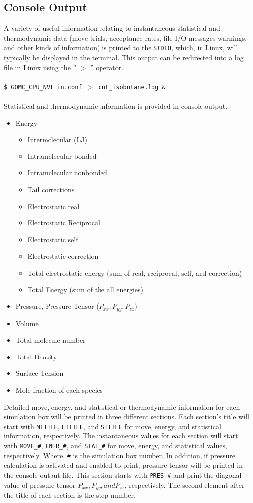 \subsection{Console Output}
A variety of useful information relating to instantaneous statistical and thermodynamic data (move trials, acceptance rates, file I/O messages warnings, and other kinds of information) is printed to the \texttt{STDIO}, which, in Linux, will typically be displayed in the terminal.  This output can be redirected into a log file in Linux using the '' $>$ '' operator.\\\\
\texttt{\$ GOMC\_CPU\_NVT   in.conf   $>$   out\_isobutane.log \&}\\\\
Statistical and thermodynamic information is provided in console output.\\
\begin{itemize}
\item Energy
	\begin{itemize}
	\item Intermolecular (LJ)
	\item Intramolecular bonded
	\item Intramolecular nonbonded
	\item Tail corrections
	\item Electrostatic real
	\item Electrostatic Reciprocal
	\item Electrostatic self
	\item Electrostatic correction
	\item Total electrostatic energy (sum of real, reciprocal, self, and correction)
	\item Total Energy (sum of the all energies)
	\end{itemize}
\item Pressure, Pressure Tensor ($P_{xx}, P_{yy}, P_{zz}$)
\item Volume
\item Total molecule number
\item Total Density
\item Surface Tension
\item Mole fraction of each species
\end{itemize}
Detailed move, energy, and statistical or thermodynamic information for each simulation box will be printed in three different sections. Each section’s title will start with \texttt{MTITLE}, \texttt{ETITLE}, and \texttt{STITLE} for move, energy, and statistical information, respectively. The instantaneous values for each section will start with \texttt{MOVE\_\#}, \texttt{ENER\_\#}, and \texttt{STAT\_\#} for move, energy, and statistical values, respectively. Where, \texttt{\#} is the simulation box number.  In addition, if pressure calculation is activated and enabled to print, pressure tensor will be printed in the console output file.  This section starts with \texttt{PRES\_\#} and print the diagonal value of pressure tensor $P_{xx}, P_{yy}, and P_{zz}$, respectively.  The second element after the title of each section is the step number.

